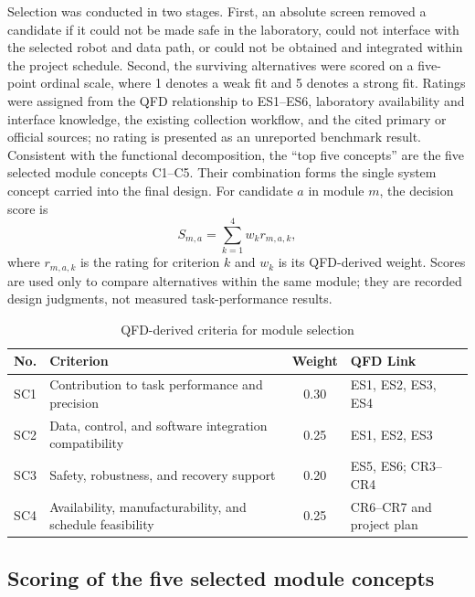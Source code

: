 Selection was conducted in two stages. First, an absolute screen removed a candidate if it could not be made safe in the laboratory, could not interface with the selected robot and data path, or could not be obtained and integrated within the project schedule. Second, the surviving alternatives were scored on a five-point ordinal scale, where 1 denotes a weak fit and 5 denotes a strong fit. Ratings were assigned from the QFD relationship to ES1--ES6, laboratory availability and interface knowledge, the existing collection workflow, and the cited primary or official sources; no rating is presented as an unreported benchmark result. Consistent with the functional decomposition, the ``top five concepts'' are the five selected module concepts C1--C5. Their combination forms the single system concept carried into the final design. For candidate $a$ in module $m$, the decision score is
\begin{equation}
S_{m,a}=\sum_{k=1}^{4} w_k r_{m,a,k},
\label{eq:module-selection-score}
\end{equation}
where $r_{m,a,k}$ is the rating for criterion $k$ and $w_k$ is its QFD-derived weight. Scores are used only to compare alternatives within the same module; they are recorded design judgments, not measured task-performance results.

\begin{table}[!htbp]
\centering
\caption{QFD-derived criteria for module selection}
\label{tab:selection-criteria}
\small
\begin{tabularx}{\textwidth}{cXcX}
\toprule
\textbf{No.} & \textbf{Criterion} & \textbf{Weight} & \textbf{QFD Link} \\
\midrule
SC1 & Contribution to task performance and precision & 0.30 & ES1, ES2, ES3, ES4 \\
SC2 & Data, control, and software integration compatibility & 0.25 & ES1, ES2, ES3 \\
SC3 & Safety, robustness, and recovery support & 0.20 & ES5, ES6; CR3--CR4 \\
SC4 & Availability, manufacturability, and schedule feasibility & 0.25 & CR6--CR7 and project plan \\
\bottomrule
\end{tabularx}
\end{table}

\subsection{Scoring of the five selected module concepts}

